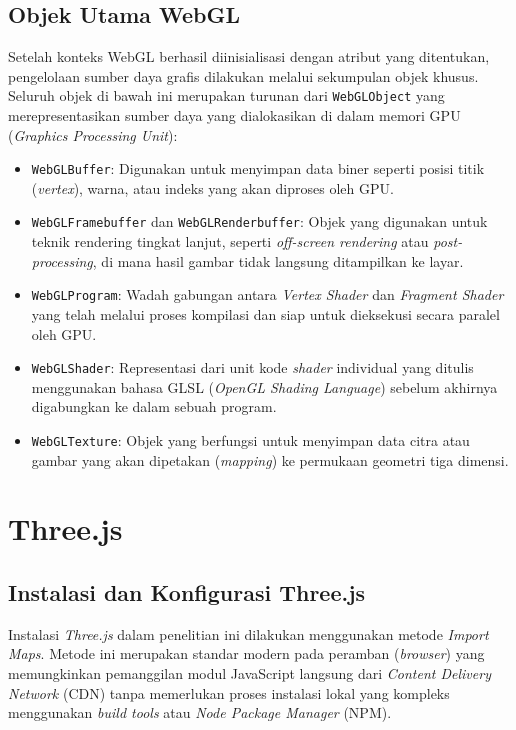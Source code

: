 \subsection{Objek Utama WebGL}
\label{subsec:objek_utama_webgl}

Setelah konteks WebGL berhasil diinisialisasi dengan atribut yang ditentukan, pengelolaan sumber daya grafis dilakukan melalui sekumpulan objek khusus. Seluruh objek di bawah ini merupakan turunan dari \texttt{WebGLObject} yang merepresentasikan sumber daya yang dialokasikan di dalam memori GPU (\textit{Graphics Processing Unit}):

\begin{itemize}
    \item \texttt{WebGLBuffer}: Digunakan untuk menyimpan data biner seperti posisi titik (\textit{vertex}), warna, atau indeks yang akan diproses oleh GPU.
    \item \texttt{WebGLFramebuffer} dan \texttt{WebGLRenderbuffer}: Objek yang digunakan untuk teknik rendering tingkat lanjut, seperti \textit{off-screen rendering} atau \textit{post-processing}, di mana hasil gambar tidak langsung ditampilkan ke layar.
    \item \texttt{WebGLProgram}: Wadah gabungan antara \textit{Vertex Shader} dan \textit{Fragment Shader} yang telah melalui proses kompilasi dan siap untuk dieksekusi secara paralel oleh GPU.
    \item \texttt{WebGLShader}: Representasi dari unit kode \textit{shader} individual yang ditulis menggunakan bahasa GLSL (\textit{OpenGL Shading Language}) sebelum akhirnya digabungkan ke dalam sebuah program.
    \item \texttt{WebGLTexture}: Objek yang berfungsi untuk menyimpan data citra atau gambar yang akan dipetakan (\textit{mapping}) ke permukaan geometri tiga dimensi.
\end{itemize}

\section {Three.js}
\subsection{Instalasi dan Konfigurasi Three.js}
\label{subsec:instalasi_threejs}

Instalasi \textit{Three.js} dalam penelitian ini dilakukan menggunakan metode \textit{Import Maps}. Metode ini merupakan standar modern pada peramban (\textit{browser}) yang memungkinkan pemanggilan modul JavaScript langsung dari \textit{Content Delivery Network} (CDN) tanpa memerlukan proses instalasi lokal yang kompleks menggunakan \textit{build tools} atau \textit{Node Package Manager} (NPM).

